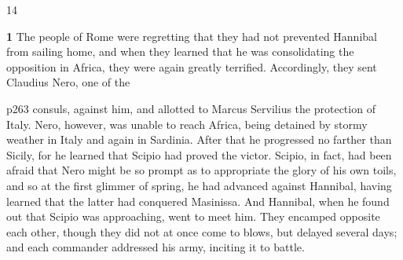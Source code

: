 14

\textbf{1} The people of Rome were regretting that they had not prevented Hannibal from sailing home, and when they learned that he was consolidating the opposition in Africa, they were again greatly terrified. Accordingly, they sent Claudius Nero, one of the

p263 consuls, against him, and allotted to Marcus Servilius the protection of Italy. Nero, however, was unable to reach Africa, being detained by stormy weather in Italy and again in Sardinia. After that he progressed no farther than Sicily, for he learned that Scipio had proved the victor. Scipio, in fact, had been afraid that Nero might be so prompt as to appropriate the glory of his own toils, and so at the first glimmer of spring, he had advanced against Hannibal, having learned that the latter had conquered Masinissa. And Hannibal, when he found out that Scipio was approaching, went to meet him. They encamped opposite each other, though they did not at once come to blows, but delayed several days; and each commander addressed his army, inciting it to battle.

